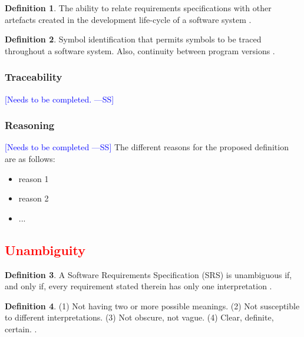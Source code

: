 \documentclass[letterpaper, cleveref]{lipics-v2019}
\newcommand{\authornote}[3]{\textcolor{#1}{[#3 ---#2]}}
\newcommand{\authornote}[3]{}
\newcommand{\wss}[1]{\authornote{blue}{SS}{#1}} %
\newcommand{\notdone}[1]{\textcolor{red}{#1}}
\theoremstyle{definition}
\newtheorem{defn}{Definition}
\begin{document}
\begin{defn}
The ability to relate requirements specifications with other artefacts created
in the development life-cycle of a software system \citep{spanoudakis2002plausible}.
\end{defn}

\begin{defn}
Symbol identification that permits symbols to be traced throughout a software system. Also, continuity between program versions \citep{graf1999modern}.
\end{defn}

\begin{mybox}
\subsubsection*{Traceability} 
\wss{Needs to be completed.}
\end{mybox}

\subsubsection*{Reasoning}

\wss{Needs to be completed}  The different reasons for the proposed definition
are as follows:

\begin{itemize}
  \item reason 1
  \item reason 2
  \item ...
\end{itemize}


\subsection{\notdone{Unambiguity}} %

\begin{defn}
 A Software Requirements Specification (SRS) is unambiguous if, and only if,
 every requirement stated therein has only one interpretation \citep{IEEE1998}.
\end{defn}

\begin{defn}
	\label{UnambiguitySelected} (1) Not having two or more possible meanings. (2) Not susceptible to different interpretations. (3) Not obscure, not vague. (4) Clear, definite, certain. \citep{FDA2014}.
\end{defn}
\end{document}
